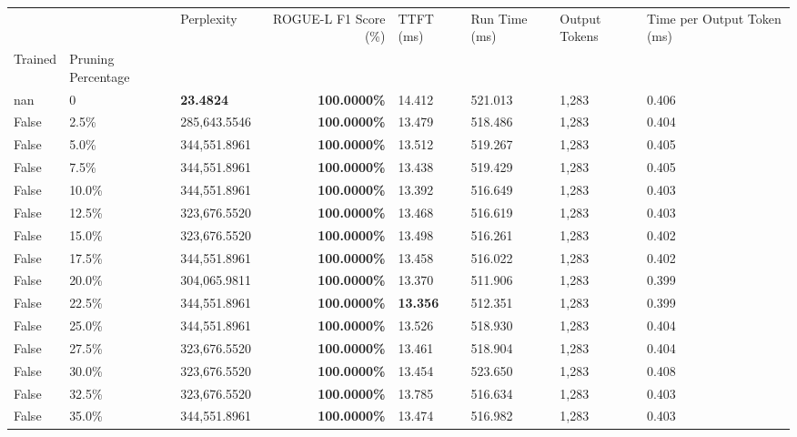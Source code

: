 \begin{table}[H]
\begin{tabular}{lllrllll}
\toprule
 &  & Perplexity & ROGUE-L F1 Score (\%) & TTFT (ms) & Run Time (ms) & Output Tokens & Time per Output Token (ms) \\
Trained & Pruning Percentage &  &  &  &  &  &  \\
\midrule
nan & 0 & \bfseries 23.4824 & \bfseries 100.0000\% & 14.412 & 521.013 & 1,283 & 0.406 \\
\cline{1-8}
False & 2.5\% & \color{red} 285,643.5546 & \bfseries \color{red} 100.0000\% & 13.479 & 518.486 & 1,283 & 0.404 \\
\cline{1-8}
False & 5.0\% & 344,551.8961 & \bfseries \color{red} 100.0000\% & 13.512 & 519.267 & 1,283 & 0.405 \\
\cline{1-8}
False & 7.5\% & 344,551.8961 & \bfseries \color{red} 100.0000\% & 13.438 & 519.429 & 1,283 & 0.405 \\
\cline{1-8}
False & 10.0\% & 344,551.8961 & \bfseries \color{red} 100.0000\% & 13.392 & 516.649 & 1,283 & 0.403 \\
\cline{1-8}
False & 12.5\% & 323,676.5520 & \bfseries \color{red} 100.0000\% & 13.468 & 516.619 & 1,283 & 0.403 \\
\cline{1-8}
False & 15.0\% & 323,676.5520 & \bfseries \color{red} 100.0000\% & 13.498 & 516.261 & 1,283 & 0.402 \\
\cline{1-8}
False & 17.5\% & 344,551.8961 & \bfseries \color{red} 100.0000\% & 13.458 & 516.022 & 1,283 & 0.402 \\
\cline{1-8}
False & 20.0\% & 304,065.9811 & \bfseries \color{red} 100.0000\% & 13.370 & 511.906 & 1,283 & 0.399 \\
\cline{1-8}
False & 22.5\% & 344,551.8961 & \bfseries \color{red} 100.0000\% & \bfseries \color{red} 13.356 & 512.351 & 1,283 & 0.399 \\
\cline{1-8}
False & 25.0\% & 344,551.8961 & \bfseries \color{red} 100.0000\% & 13.526 & 518.930 & 1,283 & 0.404 \\
\cline{1-8}
False & 27.5\% & 323,676.5520 & \bfseries \color{red} 100.0000\% & 13.461 & 518.904 & 1,283 & 0.404 \\
\cline{1-8}
False & 30.0\% & 323,676.5520 & \bfseries \color{red} 100.0000\% & 13.454 & 523.650 & 1,283 & 0.408 \\
\cline{1-8}
False & 32.5\% & 323,676.5520 & \bfseries \color{red} 100.0000\% & 13.785 & 516.634 & 1,283 & 0.403 \\
\cline{1-8}
False & 35.0\% & 344,551.8961 & \bfseries \color{red} 100.0000\% & 13.474 & 516.982 & 1,283 & 0.403 \\
\cline{1-8}

\end{tabular}
\end{table}
